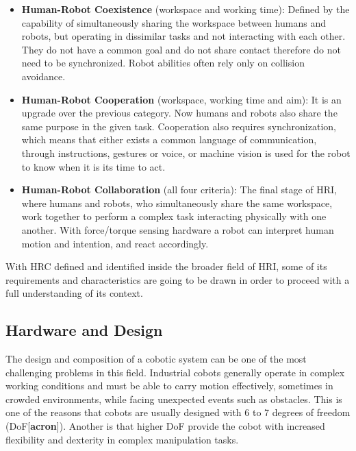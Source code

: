 \begin{itemize}
    \item \textbf{Human-Robot Coexistence} (workspace and working time): Defined by the capability of simultaneously sharing the workspace between humans and robots, but operating in dissimilar tasks and not interacting with each other. They do not have a common goal and do not share contact therefore do not need to be synchronized. Robot abilities often rely only on collision avoidance.
    \item \textbf{Human-Robot Cooperation} (workspace, working time and aim): It is an upgrade over the previous category. Now humans and robots also share the same purpose in the given task. Cooperation also requires synchronization, which means that either exists a common language of communication, through instructions, gestures or voice, or machine vision is used for the robot to know when it is its time to act.
    \item \textbf{Human-Robot Collaboration} (all four criteria): The final stage of HRI, where humans and robots, who simultaneously share the same workspace, work together to perform a complex task interacting physically with one another. With force/torque sensing hardware a robot can interpret human motion and intention, and react accordingly. 
\end{itemize}

\par With HRC defined and identified inside the broader field of HRI, some of its requirements and characteristics are going to be drawn in order to proceed with a full understanding of its context.


\subsection{Hardware and Design}

\par The design and composition of a cobotic system can be one of the most challenging problems in this field. Industrial cobots generally operate in complex working conditions and must be able to carry motion effectively, sometimes in crowded environments, while facing unexpected events such as obstacles. This is one of the reasons that cobots are usually designed with 6 to 7 degrees of freedom (DoF[\textbf{acron}]). Another is that higher DoF provide the cobot with increased flexibility and dexterity in complex manipulation tasks. 

